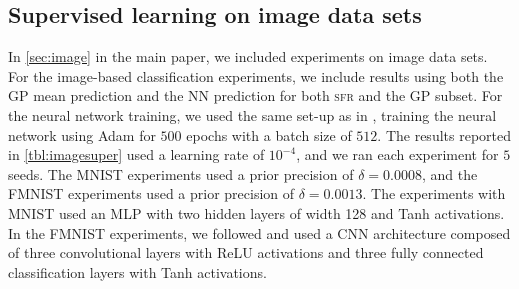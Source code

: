 \documentclass{article} %
\newcommand{\our}{\textsc{sfr}\xspace}
\begin{document}
\subsection{Supervised learning on image data sets}
\label{app:image}
In \cref{sec:image} in the main paper, we included experiments on image data sets. For the image-based classification experiments, we include results using both the GP mean prediction and the NN prediction for both \our and the GP subset.
For the neural network training, we used the same set-up as in \cite{immer2021improving},
training the neural network using Adam for $500$ epochs with a batch size of $512$.
The results reported in \cref{tbl:imagesuper} used a learning rate of $10^{-4}$, and we ran each experiment for $5$ seeds.
The MNIST experiments used a prior precision of $\delta=0.0008$, and the FMNIST experiments used a prior precision of $\delta=0.0013$.
The experiments with MNIST  used an MLP with two hidden layers of width 128 and Tanh activations.
In the FMNIST experiments, we followed \cite{immer2021improving} and used a CNN architecture composed of three convolutional layers with ReLU activations and three fully connected classification layers with Tanh activations.
\end{document}
